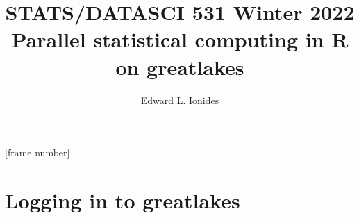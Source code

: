 
\usepackage{paralist}
\usepackage{pgfpages}
\usepackage{xspace}        
\usepackage{graphicx}
\usepackage{listings}

\setlength{\parskip}{0mm}
\setlength{\parindent}{0mm}
\lstset{language=C}

\newcommand\link[2]{\href{#1}{#2}}
\newcommand{\doi}[1]{\link{https://doi.org/#1}{\texttt{doi:~{#1}}}}
\newcommand\code[1]{\texttt{#1}}
\newcommand\package[1]{\textbf{#1}}
\newcommand\bi{\begin{itemize}}
\newcommand\ei{\end{itemize}}



\def\CHAPTER{12}
\title{STATS/DATASCI 531 Winter 2022\\Parallel statistical computing in R on greatlakes}
\author{Edward L. Ionides}

[frame number]






\maketitle



\section{Logging in to greatlakes}


